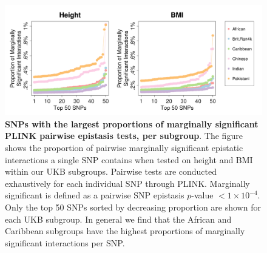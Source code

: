 \documentclass[12pt,a4paper]{article}
\def\log{{\rm log}}
\begin{document}
\begin{figure}[htb]
\centering
\hspace*{-1.7cm}
\includegraphics[scale=.45]{Images/Main/InterPath_Main_Figure_PLINK_vs4_HeightBMI.png}
\caption[TBD]{\textbf{SNPs with the largest proportions of marginally significant PLINK pairwise epistasis tests, per subgroup}. The figure shows the proportion of pairwise marginally significant epistatic interactions a single SNP contains when tested on height and BMI within our UKB subgroups. Pairwise tests are conducted exhaustively for each individual SNP through PLINK. Marginally significant is defined as a pairwise SNP epistasis $p$-value $< 1\times10^{-4}$. Only the top 50 SNPs sorted by decreasing proportion are shown for each UKB subgroup. In general we find that the African and Caribbean subgroups have the highest proportions of marginally significant interactions per SNP.}
\label{InterPath-Supp-Figure-PLINK-Proportions-HeightBMI}
\end{figure}

\end{document}
